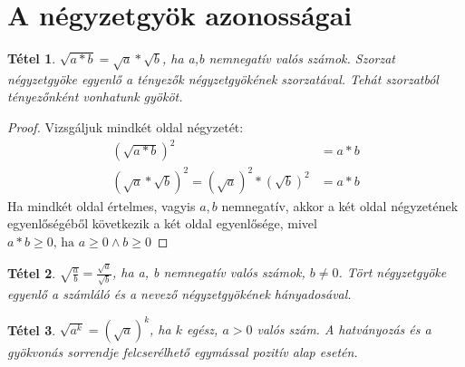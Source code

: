 \documentclass[twoside,12pt]{report}
\newtheorem{theorem}{Tétel}[section]
\theoremstyle{definition}
\begin{document}
\section{A négyzetgyök azonosságai}
	\begin{theorem}
		$\sqrt{a*b}=\sqrt{a}*\sqrt{b}$, ha a,b nemnegatív valós számok. Szorzat négyzetgyöke egyenlő a tényezők négyzetgyökének szorzatával. Tehát szorzatból tényezőnként vonhatunk gyököt.
	\end{theorem}
	\begin{proof}
		Vizsgáljuk mindkét oldal négyzetét:
		\begin{align*}
			\left(\sqrt{a*b}\right)^2&=a*b\\
			\left(\sqrt{a}*\sqrt{b}\right)^2=\left(\sqrt{a}\right)^2*\left(\sqrt{b}\right)^2&=a*b
		\end{align*}
		Ha mindkét oldal értelmes, vagyis $a,b$ nemnegatív, akkor a két oldal négyzetének egyenlőségéből következik a két oldal egyenlősége, mivel $a*b\ge 0\text{, ha } a\ge0\wedge b\ge0$
	\end{proof}
	\begin{theorem}
		$\sqrt{\frac{a}{b}}=\frac{\sqrt{a}}{\sqrt{b}}$, ha a, b nemnegatív valós számok, $b\ne0$. Tört négyzetgyöke egyenlő a számláló és a nevező négyzetgyökének hányadosával.
	\end{theorem}
	\begin{theorem}
		$\sqrt{a^k}=\left(\sqrt{a}\right)^k$, ha $k$ egész, $a>0$ valós szám. A hatványozás és a gyökvonás sorrendje felcserélhető egymással pozitív alap esetén.
	\end{theorem}
\end{document}
